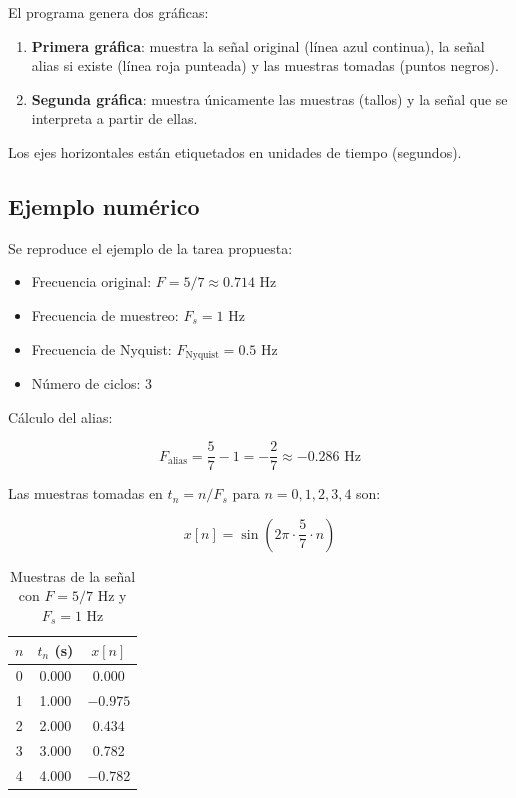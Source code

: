 \documentclass[12pt]{article}
\begin{document}
El programa genera dos gráficas:
 
\begin{enumerate}
	\item \textbf{Primera gráfica}: muestra la señal original (línea azul continua), la señal alias si existe (línea roja punteada) y las muestras tomadas (puntos negros).
	\item \textbf{Segunda gráfica}: muestra únicamente las muestras (tallos) y la señal que se interpreta a partir de ellas.
\end{enumerate}
 
Los ejes horizontales están etiquetados en unidades de tiempo (segundos).
 
\subsection*{Ejemplo numérico}
 
Se reproduce el ejemplo de la tarea propuesta:
 
\begin{itemize}
	\item Frecuencia original: $F = 5/7 \approx 0.714$ Hz
	\item Frecuencia de muestreo: $F_s = 1$ Hz
	\item Frecuencia de Nyquist: $F_{\text{Nyquist}} = 0.5$ Hz
	\item Número de ciclos: $3$
\end{itemize}
 
Cálculo del alias:
 
\begin{equation}
F_{\text{alias}} = \frac{5}{7} - 1 = -\frac{2}{7} \approx -0.286 \text{ Hz}
\end{equation}
 
Las muestras tomadas en $t_n = n/F_s$ para $n = 0, 1, 2, 3, 4$ son:
 
\begin{equation}
x[n] = \sin\left(2\pi \cdot \frac{5}{7} \cdot n\right)
\end{equation}
 
\begin{table}[H]
	\centering
	\begin{tabular}{ccc}
		\toprule
		$n$ & $t_n$ (s) & $x[n]$ \\
		\midrule
		0 & 0.000 & 0.000 \\
		1 & 1.000 & $-0.975$ \\
		2 & 2.000 & 0.434 \\
		3 & 3.000 & 0.782 \\
		4 & 4.000 & $-0.782$ \\
		\bottomrule
	\end{tabular}
	\caption{Muestras de la señal con $F = 5/7$ Hz y $F_s = 1$ Hz}
\end{table}
 
\end{document}
